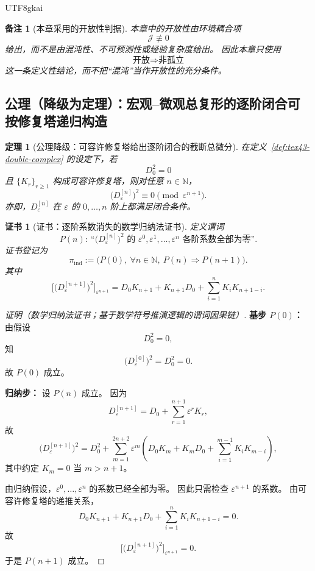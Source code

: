 \documentclass[12pt]{article}
\newtheorem{theorem}{定理}[section]
\newtheorem{remark}{备注}[section]
\newtheorem{Certificate}{证书}[section]
\newcommand{\NN}{\mathbb{N}}
\begin{document}
\begin{CJK*}{UTF8}{gkai}
\begin{remark}[本章采用的开放性判据]
本章中的开放性由环境耦合项
\[
  \mathcal J\not\equiv 0
\]
给出，而不是由混沌性、不可预测性或经验复杂度给出。
因此本章只使用
\[
  \text{开放}
  \Longrightarrow
  \text{非孤立}
\]
这一条定义性结论，而不把“混沌”当作开放性的充分条件。
\end{remark}

\subsection{公理（降级为定理）：宏观--微观总复形的逐阶闭合可按修复塔递归构造}
\label{subsec:tex43-axiom-downgrade}

\begin{theorem}[公理降级：可容许修复塔给出逐阶闭合的截断总微分]
\label{thm:tex43-repair-tower}
在定义~\ref{def:tex43-double-complex} 的设定下，若
\[
  D_0^2=0
\]
且 $\{K_r\}_{r\ge 1}$ 构成可容许修复塔，则对任意 $n\in\NN$，
\[
  \bigl(D_{\varepsilon}^{[n]}\bigr)^2
  \equiv 0
  \pmod{\varepsilon^{n+1}}.
\]
亦即，$D_{\varepsilon}^{[n]}$ 在 $\varepsilon$ 的 $0,\dots,n$ 阶上都满足闭合条件。
\end{theorem}

\begin{Certificate}[证书：逐阶系数消失的数学归纳法证书]
\label{cert:tex43-repair-tower}
定义谓词
\[
  P(n):
  \ \text{“}\bigl(D_{\varepsilon}^{[n]}\bigr)^2
  \text{ 的 }\varepsilon^0,\varepsilon^1,\dots,\varepsilon^n
  \text{ 各阶系数全部为零”}.
\]
证书登记为
\[
  \pi_{\mathrm{ind}}
  :=
  \bigl(P(0),\ \forall n\in\NN,\ P(n)\Rightarrow P(n+1)\bigr).
\]
其中
\[
  \bigl[\bigl(D_{\varepsilon}^{[n+1]}\bigr)^2\bigr]_{\varepsilon^{n+1}}
  =
  D_0K_{n+1}
  +
  K_{n+1}D_0
  +
  \sum_{i=1}^{n}K_iK_{n+1-i}.
\]
\end{Certificate}

\begin{proof}[证明（数学归纳法证书；基于数学符号推演逻辑的谓词因果链）]
\textbf{基步 $P(0)$：}
由假设
\[
  D_0^2=0,
\]
知
\[
  \bigl(D_{\varepsilon}^{[0]}\bigr)^2
  =
  D_0^2
  =0.
\]
故 $P(0)$ 成立。

\textbf{归纳步：}
设 $P(n)$ 成立。
因为
\[
  D_{\varepsilon}^{[n+1]}
  =
  D_0+\sum_{r=1}^{n+1}\varepsilon^rK_r,
\]
故
\[
  \bigl(D_{\varepsilon}^{[n+1]}\bigr)^2
  =
  D_0^2
  +
  \sum_{m=1}^{2n+2}
  \varepsilon^m
  \left(
    D_0K_m+K_mD_0+\sum_{i=1}^{m-1}K_iK_{m-i}
  \right),
\]
其中约定 $K_m=0$ 当 $m>n+1$。

由归纳假设，$\varepsilon^0,\dots,\varepsilon^n$ 的系数已经全部为零。
因此只需检查 $\varepsilon^{n+1}$ 的系数。
由可容许修复塔的递推关系，
\[
  D_0K_{n+1}
  +
  K_{n+1}D_0
  +
  \sum_{i=1}^{n}K_iK_{n+1-i}
  =0.
\]
故
\[
  \bigl[\bigl(D_{\varepsilon}^{[n+1]}\bigr)^2\bigr]_{\varepsilon^{n+1}}
  =0.
\]
于是 $P(n+1)$ 成立。


\end{proof}
\end{CJK*}
\end{document}

